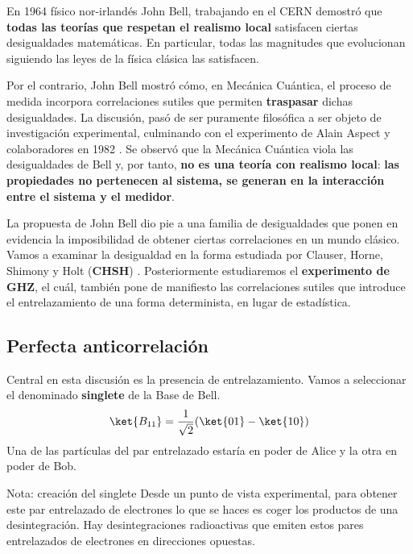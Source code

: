 \documentclass[a4paper,11pt]{book} %
\numberwithin{equation}{chapter}
\begin{document}
En 1964  físico nor-irlandés John Bell, trabajando en el CERN demostró \cite{bib_Bell} que \textbf{todas las teorías que respetan el realismo local} satisfacen ciertas desigualdades matemáticas. En particular, todas las magnitudes que evolucionan siguiendo las leyes de la física clásica las satisfacen.

Por el contrario, John Bell mostró cómo, en Mecánica Cuántica, el proceso de medida incorpora correlaciones sutiles que permiten \textbf{traspasar} dichas desigualdades. La discusión, pasó de ser puramente filosófica a ser objeto de investigación experimental, culminando con el  experimento de Alain Aspect y colaboradores en 1982 \cite{bib_Bell_experiment}. Se observó que la Mecánica Cuántica viola las desigualdades de Bell y, por tanto, \textbf{no es una teoría con realismo local}: \textbf{las propiedades no pertenecen al sistema, se generan en la interacción entre el sistema y el medidor}.

La propuesta de John Bell dio pie a una familia de desigualdades que ponen en evidencia la imposibilidad de obtener ciertas correlaciones en un mundo clásico. Vamos a examinar la desigualdad en la forma estudiada por Clauser, Horne, Shimony y Holt (\textbf{CHSH}) \cite{bib_Bell_CHSH}. Posteriormente estudiaremos el \textbf{experimento de GHZ}, el cuál, también pone de manifiesto las correlaciones sutiles que introduce el entrelazamiento de una forma determinista, en lugar de estadística.

    
        \subsection{Perfecta anticorrelación}

Central en esta discusión es la presencia de entrelazamiento. Vamos a seleccionar el denominado \textbf{singlete} de la Base de Bell. 
	\begin{equation}
	\ket{B_{11}}=\frac{1}{\sqrt{2}}(\ket{01}-\ket{10})
	\end{equation}
Una de las partículas del par entrelazado estaría en poder de Alice y la otra en poder de Bob. 

	\begin{mybox_blue}{Nota: creación del singlete}
	Desde un punto de vista experimental, para obtener este par entrelazado de electrones lo que se haces es coger los productos
	de una desintegración. Hay desintegraciones radioactivas que emiten estos pares entrelazados de electrones en direcciones 
	opuestas. 	
	\end{mybox_blue}
\end{document}
